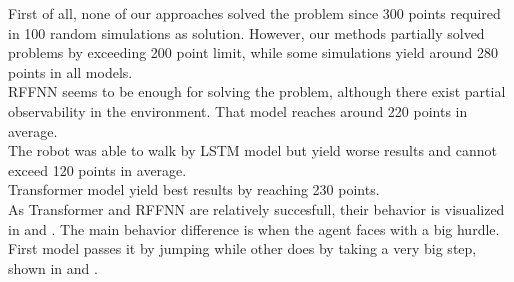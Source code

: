 First of all, none of our approaches solved the problem since 300 points required in 100 random simulations as solution. However, our methods partially solved problems by exceeding 200 point limit, while some simulations yield around 280 points in all models. \\
RFFNN seems to be enough for solving the problem, although there exist partial observability in the environment. That model reaches around 220 points in average. \\
The robot was able to walk by LSTM model but yield worse results and cannot exceed 120 points in average. \\
Transformer model yield best results by reaching 230 points.  \\
As Transformer and RFFNN are relatively succesfull, their behavior is visualized in  and . The main behavior difference is when the agent faces with a big hurdle. First model passes it by jumping while other does by taking a very big step, shown in  and .
%
